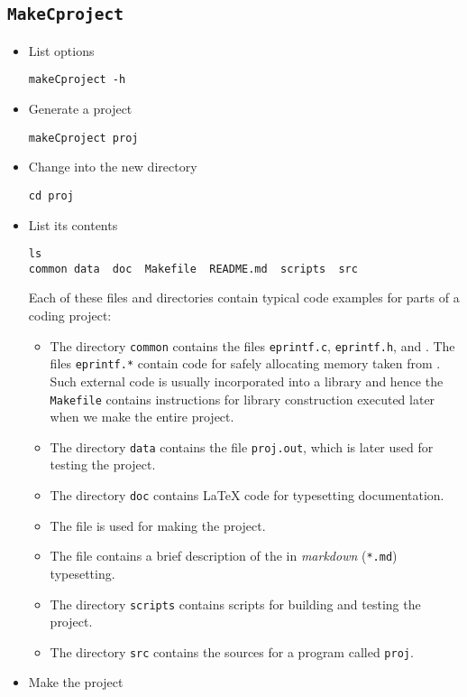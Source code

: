 \documentclass[a4paper, english]{article}
\begin{document}
\subsection{\texttt{MakeCproject}}
\begin{itemize}
\item List options
\begin{verbatim}
makeCproject -h
\end{verbatim}
\item Generate a project
\begin{verbatim}
makeCproject proj
\end{verbatim}
\item Change into the new directory
\begin{verbatim}
cd proj
\end{verbatim}
\item List its contents
\begin{verbatim}
ls
common data  doc  Makefile  README.md  scripts  src
\end{verbatim}
Each of these files and directories contain typical code examples for
parts of a coding project:
\begin{itemize}
  \item The directory \texttt{common} contains the files \texttt{eprintf.c},
    \texttt{eprintf.h}, and . The files
    \texttt{eprintf.*} contain code for safely allocating memory taken
    from  \citep[ch. 4]{ker99:pra}. Such external code is usually
    incorporated into a library and hence the \texttt{Makefile}
    contains instructions for library construction executed later when we
    make the entire project.
  \item The directory \texttt{data} contains the file
    \texttt{proj.out}, which is later used for testing the project.
  \item The directory \texttt{doc} contains \LaTeX{} code for
    typesetting documentation.
  \item The file  is used for making the project.
  \item The file  contains a brief description of the
    in \emph{markdown} (\texttt{*.md}) typesetting.
  \item The directory \texttt{scripts} contains scripts for building
    and testing the project.
  \item The directory \texttt{src} contains the sources for a program
    called \texttt{proj}.
\end{itemize}
\item Make the project

\end{itemize}
\end{document}

